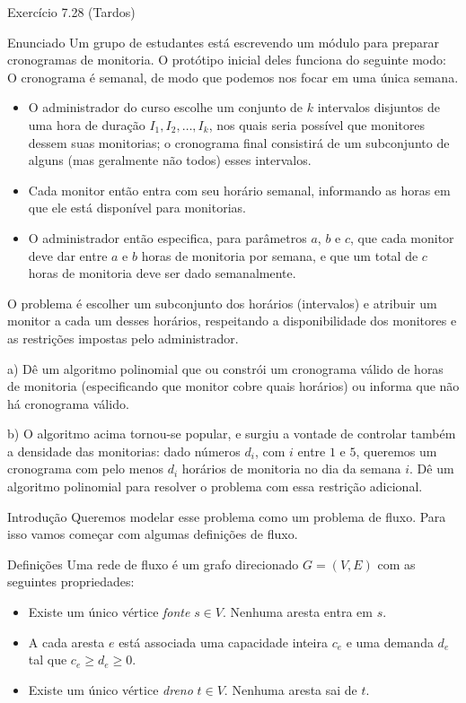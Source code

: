 \documentclass[presentation]{beamer}
\begin{document}
\begin{frame}[fragile,label=sec-2]{Exercício 7.28 (Tardos)}

 \begin{block}{Enunciado}
Um grupo de estudantes está escrevendo um módulo para preparar
cronogramas de monitoria. O protótipo inicial deles funciona do
seguinte modo: O cronograma é semanal, de modo que podemos nos focar
em uma única semana.

\begin{itemize}
\item O administrador do curso escolhe um conjunto de $k$
intervalos disjuntos de uma hora de duração $I_1, I_2, \ldots,
      I_k$, nos quais seria possível que monitores dessem suas
monitorias; o cronograma final consistirá de um subconjunto de
alguns (mas geralmente não todos) esses intervalos.
\item Cada monitor então entra com seu horário semanal, informando
as horas em que ele está disponível para monitorias.
\item O administrador então especifica, para parâmetros $a$, $b$ e
$c$, que cada monitor deve dar entre $a$ e $b$ horas de
monitoria por semana, e que um total de $c$ horas de monitoria
deve ser dado semanalmente.
\end{itemize}

O problema é escolher um subconjunto dos horários (intervalos) e
atribuir um monitor a cada um desses horários, respeitando a
disponibilidade dos monitores e as restrições impostas pelo
administrador.


a) Dê um algoritmo polinomial que ou constrói um cronograma
   válido de horas de monitoria (especificando que monitor cobre
   quais horários) ou informa que não há cronograma válido.


b) O algoritmo acima tornou-se popular, e surgiu a vontade de
   controlar também a densidade das monitorias: dado números $d_i$,
   com $i$ entre $1$ e $5$, queremos um cronograma com pelo menos
   $d_i$ horários de monitoria no dia da semana $i$. Dê um
   algoritmo polinomial para resolver o problema com essa restrição
   adicional.
\end{block}


\begin{block}{Introdução}
Queremos modelar esse problema como um problema de fluxo. Para isso
vamos começar com algumas definições de fluxo.

\begin{block}{Definições}
Uma rede de fluxo é um grafo direcionado $G =
(V, E)$ com as seguintes propriedades:
\begin{itemize}
\item Existe um único vértice \textit{fonte} $s \in V$. Nenhuma aresta entra em $s$.
\item A cada aresta $e$ está associada uma capacidade inteira $c_e$ e
uma demanda $d_e$ tal que $c_e \geq d_e \geq 0$.
\item Existe um único vértice \textit{dreno} $t \in V$. Nenhuma aresta sai de $t$.
\end{itemize}


\end{block}
\end{block}
\end{frame}
\end{document}
